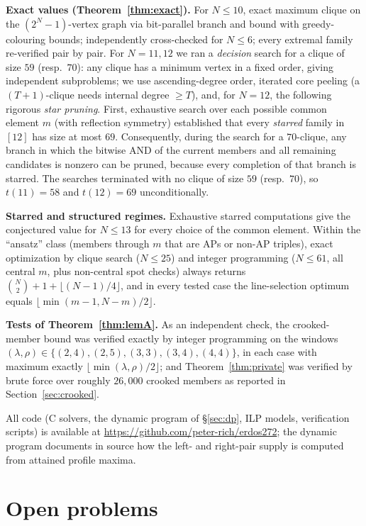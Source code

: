 \documentclass[11pt]{article}
\theoremstyle{definition}
\begin{document}
\textbf{Exact values (Theorem~\ref{thm:exact}).} For $N\le 10$, exact maximum clique on the $(2^N-1)$-vertex graph via bit-parallel branch and bound with greedy-colouring bounds; independently cross-checked for $N\le 6$; every extremal family re-verified pair by pair. For $N=11,12$ we ran a \emph{decision} search for a clique of size $59$ (resp.\ $70$): any clique has a minimum vertex in a fixed order, giving independent subproblems; we use ascending-degree order, iterated core peeling (a $(T{+}1)$-clique needs internal degree $\ge T$), and, for $N=12$, the following rigorous \emph{star pruning}. First, exhaustive search over each possible common element $m$ (with reflection symmetry) established that every \emph{starred} family in $[12]$ has size at most $69$. Consequently, during the search for a $70$-clique, any branch in which the bitwise AND of the current members and all remaining candidates is nonzero can be pruned, because every completion of that branch is starred. The searches terminated with no clique of size $59$ (resp.\ $70$), so $t(11)=58$ and $t(12)=69$ unconditionally.

\textbf{Starred and structured regimes.} Exhaustive starred computations give the conjectured value for $N\le13$ for every choice of the common element. Within the ``ansatz'' class (members through $m$ that are APs or non-AP triples), exact optimization by clique search ($N\le25$) and integer programming ($N\le61$, all central $m$, plus non-central spot checks) always returns $\binom N2+1+\lfloor (N-1)/4\rfloor$, and in every tested case the line-selection optimum equals $\lfloor\min(m-1,N-m)/2\rfloor$.

\textbf{Tests of Theorem~\ref{thm:lemA}.} As an independent check, the crooked-member bound was verified exactly by integer programming on the windows $(\lambda,\rho)\in\{(2,4),(2,5),(3,3),(3,4),(4,4)\}$, in each case with maximum exactly $\lfloor\min(\lambda,\rho)/2\rfloor$; and Theorem~\ref{thm:private} was verified by brute force over roughly $26{,}000$ crooked members as reported in Section~\ref{sec:crooked}.

All code (C solvers, the dynamic program of \S\ref{sec:dp}, ILP models, verification scripts) is available at \url{https://github.com/peter-rich/erdos272}; the dynamic program documents in source how the left- and right-pair supply is computed from attained profile maxima.

\section{Open problems}\label{sec:open}
\end{document}
